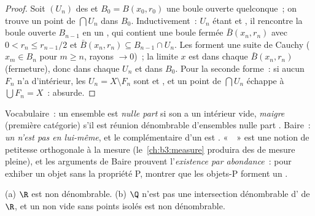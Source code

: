 \begin{proof}
Soit $(U_n)$ des   et $B_0 = B(x_0, r_0)$ une
boule ouverte quelconque~; on trouve un point de $\bigcap U_n$
dans $B_0$. Inductivement~: $U_{n}$ étant  et , il
rencontre la boule ouverte $B_{n-1}$ en un , qui contient
une boule fermée $\bar B(x_n, r_n)$ avec $0 < r_n \leq
r_{n-1}/2$ et $\bar B(x_n, r_n) \subseteq B_{n-1}\cap U_n$.
Les  forment une suite de Cauchy ($x_m \in B_n$ pour $m
\geq n$, rayons $\to 0$)~; la limite $x$ est dans chaque $\bar
B(x_n, r_n)$ (fermeture), donc dans chaque $U_n$ et dans $B_0$.
Pour la seconde forme~: si aucun $F_n$ n'a d'intérieur, les
$U_n = X \setminus F_n$ sont  et , et un point de
$\bigcap U_n$ échappe à $\bigcup F_n = X$~: absurde.
\end{proof}

\begin{remark}\label{rem:b3:complete:meagre}
Vocabulaire~: un ensemble est \emph{nulle part } si son
 a un intérieur vide, \emph{maigre} (première catégorie) s'il est réunion dénombrable
d'ensembles nulle part . Baire~: \emph{un  n'est pas  en lui-même}, et le complémentaire
d'un  est . «~~» est une notion de
petitesse orthogonale à la mesure (le~\cref{ch:b3:measure}
produira des  de mesure pleine), et les
arguments de Baire prouvent l'\emph{existence par abondance}~:
pour exhiber un objet sans la propriété P, montrer que les
objets-P forment un .
\end{remark}

\begin{corollary}\label{cor:b3:complete:bairecors}
(a) $\R$ est non dénombrable. (b) $\Q$ n'est pas une
intersection dénombrable d' de $\R$, et un  non vide sans points isolés est non
dénombrable.
\end{corollary}

